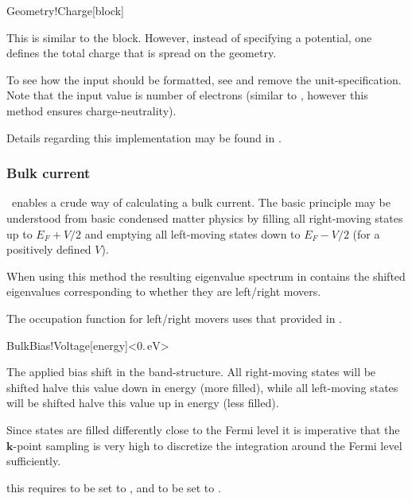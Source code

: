   \begin{fdfentry}{Geometry!Charge}[block]%
  
    This is similar to the  block. However,
    instead of specifying a potential, one defines the total charge that
    is spread on the geometry.
  
    To see how the input should be formatted, see
     and remove the unit-specification. Note that
    the input value is number of electrons (similar to ,
    however this method ensures charge-neutrality).
  
    Details regarding this implementation may be found in
    \citet{Papior2016a}.
  
  \end{fdfentry}
  
  
  \subsubsection{Bulk current}
  
  \siesta\ enables a crude way of calculating a bulk current. The basic
  principle may be understood from basic condensed matter physics by
  filling all right-moving states up to $E_F + V/2$ and emptying all
  left-moving states down to $E_F - V/2$ (for a positively defined
  $V$).
  
  When using this method the resulting eigenvalue spectrum in
   contains the shifted eigenvalues corresponding to
  whether they are left/right movers.
  
  The occupation function for left/right movers uses that provided in
  .
  
  \begin{fdfentry}{BulkBias!Voltage}[energy]<$0.\,\mathrm{eV}$>
  
    The applied bias shift in the band-structure. All right-moving
    states will be shifted halve this value down in energy (more
    filled), while all left-moving states will be shifted halve this
    value up in energy (less filled).
  
    Since states are filled differently close to the Fermi level it is
    imperative that the $\mathbf k$-point sampling is very high to
    discretize the integration around the Fermi level sufficiently.
  
    \note this requires  to be set to \fdftrue,
    and  to be set to \fdffalse.
  
  \end{fdfentry}
  
